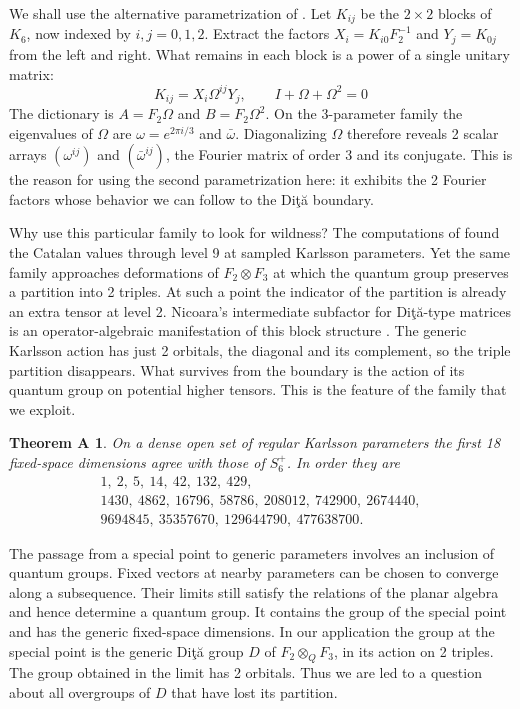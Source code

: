 \documentclass[11pt,a4paper]{amsart}
\newtheorem*{thmA}{Theorem A}
\begin{document}
We shall use the alternative parametrization of \cite[Section~7]{bo}. Let $K_{ij}$ be the $2\times2$ blocks of $K_6$, now indexed by $i,j=0,1,2$. Extract the factors $X_i=K_{i0}F_2^{-1}$ and $Y_j=K_{0j}$ from the left and right. What remains in each block is a power of a single unitary matrix:
\[
 K_{ij}=X_i\Omega^{ij}Y_j,\qquad I+\Omega+\Omega^2=0
\]
The dictionary is $A=F_2\Omega$ and $B=F_2\Omega^2$. On the 3-parameter family the eigenvalues of $\Omega$ are $\omega=e^{2\pi i/3}$ and $\bar\omega$. Diagonalizing $\Omega$ therefore reveals 2 scalar arrays $(\omega^{ij})$ and $(\bar\omega^{ij})$, the Fourier matrix of order 3 and its conjugate. This is the reason for using the second parametrization here: it exhibits the 2 Fourier factors whose behavior we can follow to the Di\c t\u a boundary.

Why use this particular family to look for wildness? The computations of \cite{bo} found the Catalan values through level 9 at sampled Karlsson parameters. Yet the same family approaches deformations of $F_2\otimes F_3$ at which the quantum group preserves a partition into 2 triples. At such a point the indicator of the partition is already an extra tensor at level 2. Nicoara's intermediate subfactor for Di\c t\u a-type matrices is an operator-algebraic manifestation of this block structure \cite{ni}. The generic Karlsson action has just 2 orbitals, the diagonal and its complement, so the triple partition disappears. What survives from the boundary is the action of its quantum group on potential higher tensors. This is the feature of the family that we exploit.

\begin{thmA}
On a dense open set of regular Karlsson parameters the first 18 fixed-space dimensions agree with those of $S_6^+$. In order they are
\[
\begin{gathered}
1,\ 2,\ 5,\ 14,\ 42,\ 132,\ 429,\\
1430,\ 4862,\ 16796,\ 58786,\ 208012,\ 742900,\ 2674440,\\
9694845,\ 35357670,\ 129644790,\ 477638700 .
\end{gathered}
\]
\end{thmA}

The passage from a special point to generic parameters involves an inclusion of quantum groups. Fixed vectors at nearby parameters can be chosen to converge along a subsequence. Their limits still satisfy the relations of the planar algebra and hence determine a quantum group. It contains the group of the special point and has the generic fixed-space dimensions. In our application the group at the special point is the generic Di\c t\u a group $D$ of $F_2\otimes_QF_3$, in its action on 2 triples. The group obtained in the limit has 2 orbitals. Thus we are led to a question about all overgroups of $D$ that have lost its partition.
\end{document}
